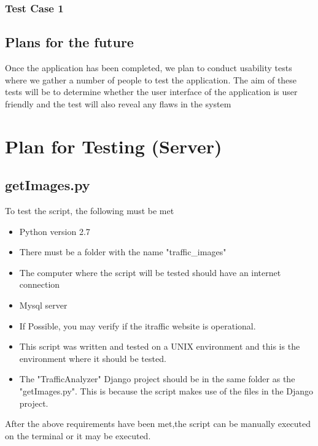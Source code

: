 \documentclass{article}
\begin{document}
\subsubsection{Test Case 1}
\subsection{Plans for the future}
Once the application has been completed, we plan to conduct usability tests where we gather a number of people to test the application. The aim of these tests will be to determine whether the user interface of the application is user friendly and the test will also reveal any flaws in the system
\section{Plan for Testing (Server)}
\subsection{getImages.py}
To test the script, the following must be met
\begin{itemize}
\item Python version 2.7
\item There must be a folder with the name "traffic\_images"
\item The computer where the script will be tested should have an internet connection
\item Mysql server
\item If Possible, you may verify if the itraffic website is operational.
\item This script was written and tested on a UNIX environment and this is the environment where it should be tested.
\item The "TrafficAnalyzer" Django project should be in the same folder as the "getImages.py". This is because the script makes use of the files in the Django project.
\end{itemize}

After the above requirements have been met,the script can be manually executed on the terminal or it may be executed.
\end{document}
